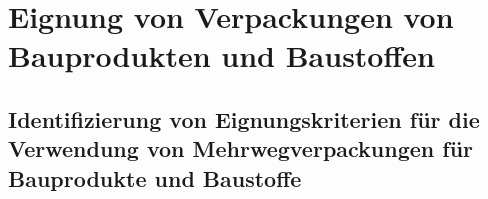 


\chapter{Eignung von Verpackungen von Bauprodukten und Baustoffen}
\label{ch:Eignung von Verpackungen von Bauprodukten und Baustoffen}

\section{Identifizierung von Eignungskriterien für die Verwendung von Mehrwegverpackungen für Bauprodukte und Baustoffe}
\label{sec:Eignung von Verpackungen von Bauprodukten und Baustoffen:Identifizierung von Eignungskriterien für die Verwendung für Mehrwegverpackungen von Bauprodukte und Baustoffe}


                         
